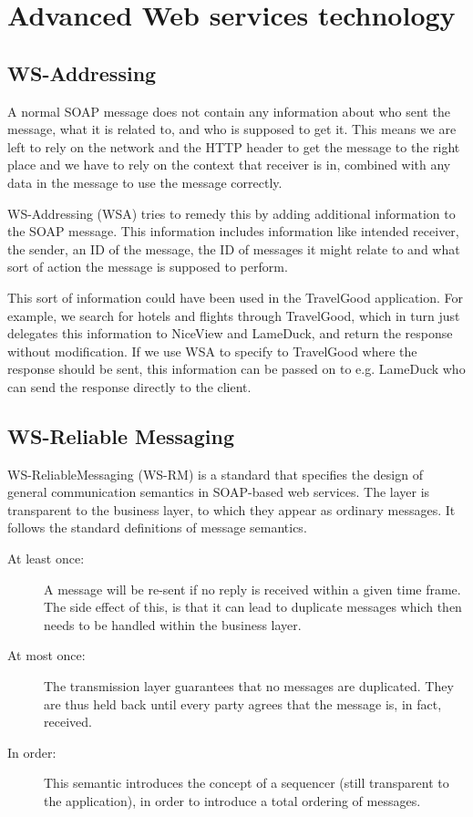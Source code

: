 \chapter{Advanced Web services technology}

\section{WS-Addressing}
\mrb

\noindent
A normal SOAP message does not contain any information about who sent the message, what it is related to, and who is supposed to get it. This means we are left to rely on the network and the HTTP header to get the message to the right place and we have to rely on the context that receiver is in, combined with any data in the message to use the message correctly.

WS-Addressing (WSA) tries to remedy this by adding additional information to the SOAP message. This information includes information like intended receiver, the sender, an ID of the message, the ID of messages it might relate to and what sort of action the message is supposed to perform.

This sort of information could have been used in the TravelGood application. For example, we search for hotels and flights through TravelGood, which in turn just delegates this information to NiceView and LameDuck, and return the response without modification. If we use WSA to specify to TravelGood where the response should be sent, this information can be passed on to e.g. LameDuck who can send the response directly to the client.

\section{WS-Reliable Messaging}
\mkt

\noindent
WS-ReliableMessaging (WS-RM) is a standard that specifies the design of general communication semantics in SOAP-based web services. The layer is transparent to the business layer, to which they appear as ordinary messages.
It follows the standard definitions of message semantics.

\begin{description}
\item[At least once:] A message will be re-sent if no reply is received within a given time frame. The side effect of this, is that it can lead to duplicate messages which then needs to be handled within the business layer.
\item[At most once:] The transmission layer guarantees that no messages are duplicated. They are thus held back until every party agrees that the message is, in fact, received.
\item[In order:] This semantic introduces the concept of a sequencer (still transparent to the application), in order to introduce a total ordering of messages.
\end{description}

